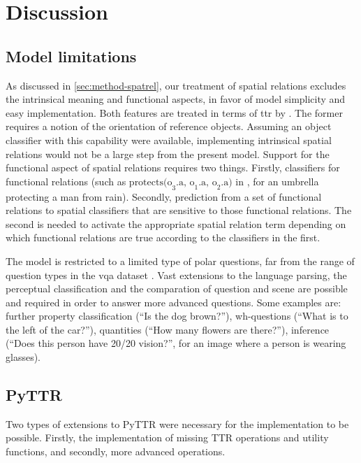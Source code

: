 \section{Discussion}
\label{sec:discussion}



\subsection{Model limitations}

As discussed in \autoref{sec:method-spatrel}, our treatment of spatial relations excludes the intrinsical meaning and functional aspects, in favor of model simplicity and easy implementation.
Both features are treated in terms of \gls{ttr} by \cite{ttrspat}.
The former requires a notion of the orientation of reference objects.
Assuming an object classifier with this capability were available, implementing intrinsical spatial relations would not be a large step from the present model.
Support for the functional aspect of spatial relations requires two things.
Firstly, classifiers for functional relations (such as $\text{protects(o}_3\text{.a, o}_1\text{.a, o}_2\text{.a)}$ in \cite{ttrspat}, for an umbrella protecting a man from rain).
Secondly, prediction from a set of functional relations to spatial classifiers that are sensitive to those functional relations.
The second is needed to activate the appropriate spatial relation term depending on which functional relations are true according to the classifiers in the first.

The model is restricted to a limited type of polar questions, far from the range of question types in the \gls{vqa} dataset \citep{AgrawalVQAVisualQuestion2015}.
Vast extensions to the language parsing, the perceptual classification and the comparation of question and scene are possible and required in order to answer more advanced questions.
Some examples are:
further property classification (``Is the dog brown?''),
wh-questions (``What is to the left of the car?''),
quantities (``How many flowers are there?''),
inference (``Does this person have 20/20 vision?'', for an image where a person is wearing glasses).



\subsection{PyTTR}

Two types of extensions to PyTTR were necessary for the implementation to be possible.
Firstly, the implementation of missing TTR operations and utility functions, and secondly, more advanced operations.



